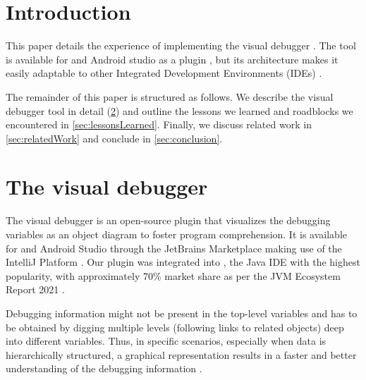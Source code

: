 \documentclass[sigconf]{acmart}
\begin{document}

\maketitle

\section{Introduction}
This paper details the experience of implementing the visual debugger \cite{krauterVisualDebuggerTool2022}.
The tool is available for \intellij{} and Android studio as a plugin \cite{timkrauterVisualDebuggerIntelliJ2023}, but its architecture makes it easily adaptable to other Integrated Development Environments (IDEs) \cite{krauterVisualDebuggerTool2022}.


The remainder of this paper is structured as follows.
We describe the visual debugger tool in detail (\cref{sec:visualDebugger}) and outline the lessons we learned and roadblocks we encountered in \cref{sec:lessonsLearned}.
Finally, we discuss related work in \cref{sec:relatedWork} and conclude in \cref{sec:conclusion}.


\section{The visual debugger} \label{sec:visualDebugger}
The visual debugger is an open-source \intellij{} plugin that visualizes the debugging variables as an object diagram to foster program comprehension.
It is available for \intellij{} and Android Studio through the JetBrains Marketplace \cite{timkrauterVisualDebuggerIntelliJ2023, timkrauterVisualDebuggerTool2023} making use of the IntelliJ Platform \cite{kurbatovaIntelliJPlatformFramework2021}.
Our plugin was integrated into \intellij{}, the Java IDE with the highest popularity, with approximately 70\% market share as per the JVM Ecosystem Report 2021 \cite{brianvermeerJVMEcosystemReport2021}.

Debugging information might not be present in the top-level variables and has to be obtained by digging multiple levels (following links to related objects) deep into different variables.
Thus, in specific scenarios, especially when data is hierarchically structured, a graphical representation results in a faster and better understanding of the debugging information \cite{krauterVisualDebuggerTool2022}.
\end{document}
